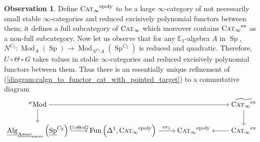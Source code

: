 \documentclass{article}
\DeclareMathOperator{\Alg}{Alg}
\DeclareMathOperator{\CAT}{C\normalfont\textsc{at}_\infty} %
\DeclareMathOperator{\Fun}{Fun} %
\DeclareMathOperator{\Mod}{Mod} %
\DeclareMathOperator{\Modh}{{}^{\sigma}Mod} %
\DeclareMathOperator{\Spectra}{Sp} %
\newcommand{\EE}{\mathbb{E}}
\newcommand{\epoly}{\mathrm{epoly}}
\newcommand{\ev}{\mathrm{ev}}
\theoremstyle{definition}
\newtheorem{observation}[equation]{Observation}
\begin{document}
\begin{observation}
    Define $ \CAT^\epoly $ to be a large $ \infty $-category of not necessarily small stable $ \infty $-categories and reduced excisively polynomial functors between them; it defines a full subcategory of $ \CAT $ which moreover contains $ \CAT^{\mathrm{ex}} $ as a non-full subcategory. 
    Now let us observe that for any $ \EE_1 $-algebra $ A $ in $ \Spectra $, $ N^{C_2} \colon \Mod_A(\Spectra) \to \Mod_{N^{C_2}A}\left(\Spectra^{C_2}\right) $ is reduced and quadratic. 
    Therefore, $ U \circ \Theta \circ G $ takes values in stable $ \infty $-categories and reduced excisively polynomial functors between them. 
    Thus there is an essentially unique refinement of (\ref{diagram:calgp_to_functor_cat_with_pointed_target}) to a commutative diagram
    \begin{equation}\label{diagram:calgp_to_epoly_functor_cat_with_pointed_target}
    \begin{tikzcd}[cramped]
        \Modh \ar[rrr] \ar[d] & & & \widetilde{\CAT^{\mathrm{ex}}} \ar[d] \\ 
        \underline{\Alg}_{\underline{\mathrm{Assoc}}_{\mathrm{naive}}}\left(\underline{\Spectra}^{C_2}\right) \ar[r,"{U \circ \Theta \circ G}"] & \Fun\left(\Delta^1, \CAT^\epoly \right) \ar[r,"{\ev_1}"] & \CAT^\epoly & \CAT^{\mathrm{ex}} \ar[l] 
    \end{tikzcd}
    \end{equation} 
\end{observation}
\end{document}
